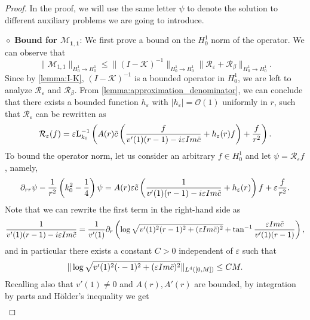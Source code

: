 \documentclass[10pt,a4paper]{amsart}
\def\Im{{\rm Im}}
\def\de{{\partial}}
\def\eps{\varepsilon}
\newcommand{\cM}{\mathcal{M}}
\newcommand{\rmL}{\mathrm{L}}
\newcommand{\taninv}{\tan^{-1}}
\begin{document}
\begin{proof}
In the proof, we will use the same letter $\psi$ to denote the solution to different auxiliary problems we are going to introduce.

\medskip
\noindent $\diamond$
\textbf{Bound for $\mathbf{\cM_{1,1}}$}: We first prove a bound on the $H^1_0$ norm of the operator. We can observe that
\begin{equation}
\label{eq:M_decomposition}
   \| \cM_{1,1}\|_{H^1_0\rightarrow H^1_0} \leq  \| (I-\mathcal K)^{-1}\|_{H^1_0\to H^1_0} \| \mathcal R_\varepsilon + \mathcal R_\beta \|_{H^1_0\to H^1_0}.
\end{equation}
Since by \cref{lemma:I-K}, $(I-\mathcal K)^{-1}$ is a bounded operator in $H^1_0$, we are left to analyze $\mathcal R_\varepsilon$ and $\mathcal R_\beta$. From \cref{lemma:approximation_denominator}, we can conclude that there exists a bounded function $h_\eps$ with $|h_\eps| = \mathcal{O}(1)$ uniformly in $r$,  such that $\mathcal R_\varepsilon$ can be rewritten as 
\begin{equation}
    \mathcal R_\varepsilon (f) = \varepsilon \rmL_{k_0}^{-1} \left(A(r) \tilde{c} \left(\frac{f}{v'(1)(r-1)- i \eps  \Im \tilde{c}} + h_\eps(r)f\right)+ \frac{f}{r^2}\right).
\end{equation}
To bound the operator norm, let us consider an arbitrary $f \in H^1_0$ and let $\psi = \mathcal R_\varepsilon f$, namely,
\begin{equation}
\label{eq:reps_eqn}
\partial_{rr}\psi - \frac{1}{r^2} \left(k_0^2-\frac{1}{4}\right) \psi = A(r) \eps \tilde{c} \left(\frac{1}{v'(1)(r-1)-i \eps \Im \tilde{c}} + h_\eps(r) \right) f + \varepsilon \frac{f}{r^2}.
\end{equation}
Note that we can rewrite the first term in the right-hand side as
\begin{align}
\label{eq:log_rewriting}
    \frac{1}{v'(1)(r-1)-i \eps \Im \tilde{c}} = \frac{1}{v'(1)} \de_r \left(\log\sqrt{v'(1)^2(r-1)^2 + (\varepsilon \Im\tilde{c})^2} + \taninv\frac{\varepsilon \Im \tilde{c}}{v'(1)(r-1)}\right),
\end{align}
and in particular there exists a constant $C>0$ independent of $\eps$ such that 
\begin{equation}
\|\log\sqrt{v'(1)^2(\cdot-1)^2 + (\varepsilon \Im\tilde{c})^2} \|_{L^4([0,M])}\leq C M.
\end{equation}
Recalling also that $v'(1) \neq 0$ and $A(r),A'(r)$ are bounded, by integration by parts and H\"older's inequality we get 
\begin{align}

\end{align}
\end{proof}
\end{document}
